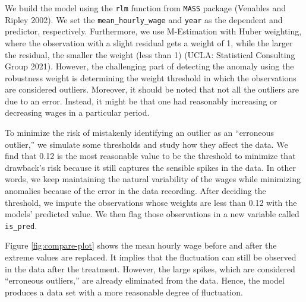 \documentclass[12pt]{article}
\begin{document}
We build the model using the \texttt{rlm} function from \texttt{MASS} package (Venables and Ripley 2002). We set the \texttt{mean\_hourly\_wage} and \texttt{year} as the dependent and predictor, respectively. Furthermore, we use M-Estimation with Huber weighting, where the observation with a slight residual gets a weight of 1, while the larger the residual, the smaller the weight (less than 1) (UCLA: Statistical Consulting Group 2021). However, the challenging part of detecting the anomaly using the robustness weight is determining the weight threshold in which the observations are considered outliers. Moreover, it should be noted that not all the outliers are due to an error. Instead, it might be that one had reasonably increasing or decreasing wages in a particular period.

To minimize the risk of mistakenly identifying an outlier as an ``erroneous outlier,'' we simulate some thresholds and study how they affect the data. We find that 0.12 is the most reasonable value to be the threshold to minimize that drawback's risk because it still captures the sensible spikes in the data. In other words, we keep maintaining the natural variability of the wages while minimizing anomalies because of the error in the data recording. After deciding the threshold, we impute the observations whose weights are less than 0.12 with the models' predicted value. We then flag those observations in a new variable called \texttt{is\_pred}.

Figure \ref{fig:compare-plot} shows the mean hourly wage before and after the extreme values are replaced. It implies that the fluctuation can still be observed in the data after the treatment. However, the large spikes, which are considered ``erroneous outliers,'' are already eliminated from the data. Hence, the model produces a data set with a more reasonable degree of fluctuation.
\end{document}
